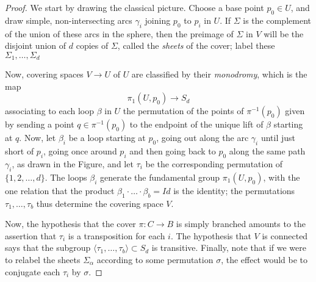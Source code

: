 \begin{proof}
  We start by drawing the classical picture. Choose a base point $p_0 \in U$, and draw simple, non-intersecting arcs $\gamma_i$ joining $p_0$ to $p_i$ in $U$. If $\Sigma$ is the complement of the union of these arcs in the sphere, then the preimage of $\Sigma$ in $V$ will be the disjoint union of $d$ copies of $\Sigma$, called the \emph{sheets} of the cover; label these $\Sigma_1,\dots,\Sigma_d$
   
  
   
   Now, covering spaces $V \to U$ of $U$ are classified by their \emph{monodromy}, which is the map
   $$
   \pi_1(U, p_0) \to S_d
   $$
   associating to each loop $\beta$ in $U$ the permutation of the points of $\pi^{-1}(p_0)$ given by sending a point $q \in \pi^{-1}(p_0)$ to the endpoint of the unique lift of $\beta$ starting at $q$. Now, let $\beta_i$ be a loop starting at $p_0$, going out along the arc $\gamma_i$ until just short of $p_i$, going once around $p_i$ and then going back to $p_0$ along the same path $\gamma_i$, as drawn in the Figure, and let $\tau_i$ be the corresponding permutation of $\{1,2,\dots,d\}$. The loops $\beta_i$  generate the fundamental group $\pi_1(U, p_0)$, with the one relation that the product $\beta_1\cdot \dots \cdot \beta_b = Id$ is the identity; the permutations $\tau_1,\dots,\tau_b$ thus determine the covering space $V$.
   

   
Now, the hypothesis that the cover $\pi : C \to B$ is simply branched amounts to the assertion that $\tau_i$ is a transposition for each $i$. The hypothesis that $V$ is connected says that the subgroup $\langle \tau_1, \dots, \tau_b \rangle \subset S_d$ is transitive. Finally, note that if we were to relabel the sheets $\Sigma_\alpha$ according to some permutation $\sigma$, the effect would be to conjugate each $\tau_i$ by $\sigma$. 


\end{proof}
